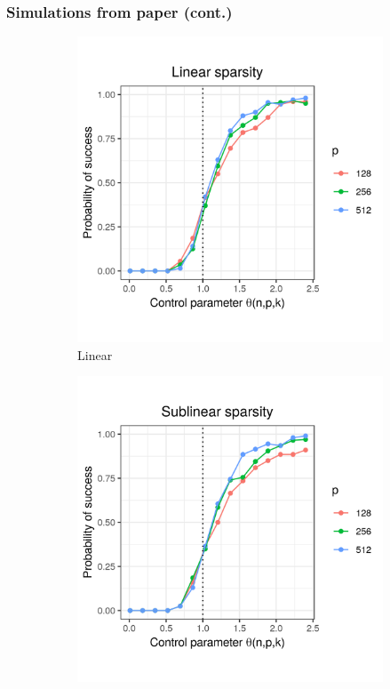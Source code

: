 \documentclass{beamer}
\begin{document}
\begin{frame}
\frametitle{Simulations from paper (cont.)}

\begin{figure}[h]
  \centering
  \begin{subfigure}{0.32\textwidth}
    \includegraphics[width=0.9\linewidth]{nonuniform_linear_sparsity_alpha_1}
    \caption{Linear}
  \end{subfigure}
  \begin{subfigure}{0.32\textwidth}
    \includegraphics[width=0.9\linewidth]{nonuniform_sublinear_sparsity_alpha_1}

\end{subfigure}
\end{figure}
\end{frame}
\end{document}

